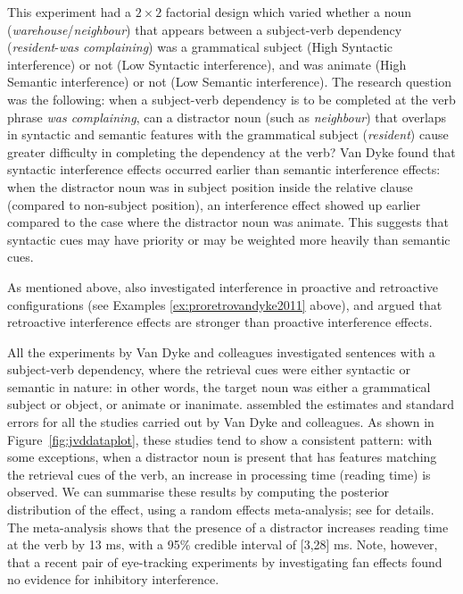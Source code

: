 \documentclass{cambridge7A}\usepackage[]{graphicx}\usepackage[]{color}
\begin{document}
This experiment had a $2\times 2$ factorial design which varied whether a noun (\textit{warehouse}/\textit{neighbour})  that appears between a subject-verb dependency (\textit{resident}-\textit{was complaining}) was a grammatical subject (High Syntactic interference) or not (Low Syntactic interference), and was animate (High Semantic interference) or not (Low Semantic interference).  The research question was the following: when a subject-verb dependency is to be completed at the verb phrase \textit{was complaining}, can a distractor noun (such as \textit{neighbour}) that overlaps in syntactic and semantic features with the grammatical subject (\textit{resident}) cause greater difficulty in completing the dependency at the verb?
Van Dyke found that syntactic interference effects occurred earlier than semantic interference effects: when the distractor noun was in subject position inside the relative clause (compared to non-subject position), an interference effect showed up earlier compared to the case where the distractor noun was animate. This suggests that syntactic cues may have priority or may be weighted more heavily than semantic cues.

As mentioned above, \cite{VanDykeMcElree2011} also investigated interference in  proactive and  retroactive configurations (see Examples \ref{ex:proretrovandyke2011} above), and argued that  retroactive interference effects are stronger than  proactive interference effects.




All the experiments by Van Dyke and colleagues investigated sentences with a subject-verb dependency, where the retrieval cues were either syntactic or semantic in nature:  in other words, the target noun was either a grammatical subject or object,  or animate or inanimate. \cite{JaegerEngelmannVasishth2017} assembled the estimates and standard errors for all the studies carried out by Van Dyke and colleagues. As shown in Figure~\ref{fig:jvddataplot}, these studies tend to show a consistent pattern: with some exceptions, when a distractor noun is present that has features matching the retrieval cues of the verb, an increase in processing time (reading time) is observed. 
We can summarise these results by computing the posterior distribution of the effect, using a random effects  meta-analysis; see \cite{JaegerEngelmannVasishth2017} for details. The meta-analysis shows that the presence of a distractor increases reading time at the verb by 13 ms, with a 95\% credible interval of [3,28] ms. Note, however, that a recent pair of eye-tracking experiments by \cite{CunningsSturt2018} investigating fan effects found no evidence  for inhibitory interference.  
\end{document}
